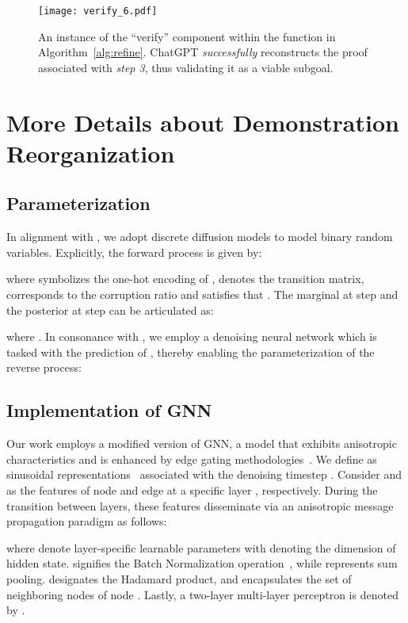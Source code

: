 \documentclass{article}
\begin{document}
\begin{figure*}
    \centering
    \texttt{[image: verify\_6.pdf]}
    \caption{An instance of the ``verify'' component within the  function in Algorithm~\ref{alg:refine}.  ChatGPT \emph{successfully} reconstructs the proof associated with \emph{step 3}, thus validating it as a viable subgoal.}
    \label{fig:verify_6}
\end{figure*}






\clearpage
\section{More Details about Demonstration Reorganization}
\label{sec:appendix_diff}

\subsection{Parameterization}
In alignment with \citet{austin2021structured}, we adopt discrete diffusion models to model binary random variables. Explicitly, the forward process is given by:

where  symbolizes the one-hot encoding of ,  denotes the transition matrix,  corresponds to the corruption ratio and satisfies that .
The marginal at step  and the posterior at step  can be articulated as:

where . In consonance with \citet{austin2021structured},
we employ a denoising neural network which is tasked with the prediction of , thereby enabling the parameterization of the reverse process:


\subsection{Implementation of GNN}

Our work employs a modified version of GNN, a model that exhibits anisotropic characteristics and is enhanced by edge gating methodologies~\cite{bresson2018experimental,sun2023difusco}. We define  as sinusoidal representations~\cite{vaswani2017attention} associated with the denoising timestep . Consider  and  as the features of node  and edge  at a specific layer , respectively. During the transition between layers, these features disseminate via an anisotropic message propagation paradigm as follows:

where  denote layer-specific learnable parameters with  denoting the dimension of hidden state.   signifies the Batch Normalization operation~\cite{ioffe2015batch}, while  represents sum pooling.  designates the Hadamard product, and  encapsulates the set of neighboring nodes of node . Lastly, a two-layer multi-layer perceptron is denoted by .
\end{document}
